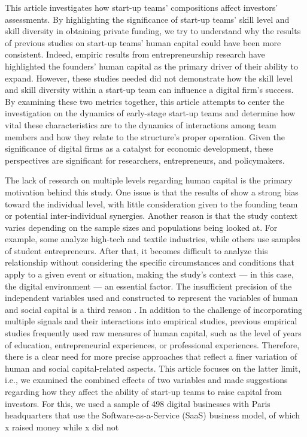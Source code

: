\documentclass[12pt]{article}
\begin{document}
This article investigates how start-up teams' compositions affect investors' assessments. By highlighting the significance of start-up teams' skill level and skill diversity in obtaining private funding, we try to understand why the results of previous studies on start-up teams' human capital could have been more consistent. Indeed, empiric results from entrepreneurship research have highlighted the founders' human capital as the primary driver of their ability to expand. However, these studies needed did not demonstrate how the skill level and skill diversity within a start-up team can influence a digital firm's success. By examining these two metrics together, this article attempts to center the investigation on the dynamics of early-stage start-up teams and determine how vital these characteristics are to the dynamics of interactions among team members and how they relate to the structure's proper operation. Given the significance of digital firms as a catalyst for economic development, these perspectives are significant for researchers, entrepreneurs, and policymakers.

The lack of research on multiple levels regarding human capital is the primary motivation behind this study. One issue is that the results of \citep{marvel2016human} show a strong bias toward the individual level, with little consideration given to the founding team or potential inter-individual synergies. Another reason is that the study context varies depending on the sample sizes and populations being looked at. For example, some analyze high-tech and textile industries, while others use samples of student entrepreneurs. After that, it becomes difficult to analyze this relationship without considering the specific circumstances and conditions that apply to a given event or situation, making the study's context — in this case, the digital environment — an essential factor. The insufficient precision of the independent variables used and constructed to represent the variables of human and social capital is a third reason \citep{harrison2007s}. In addition to the challenge of incorporating multiple signals and their interactions into empirical studies, previous empirical studies frequently used raw measures of human capital, such as the level of years of education, entrepreneurial experiences, or professional experiences. Therefore, there is a clear need for more precise approaches that reflect a finer variation of human and social capital-related aspects. This article focuses on the latter limit, i.e., we examined the combined effects of two variables and made suggestions regarding how they affect the ability of start-up teams to raise capital from investors. For this, we used a sample of 498 digital businesses with Paris headquarters that use the Software-as-a-Service (SaaS) business model, of which x raised money while x did not
\end{document}
